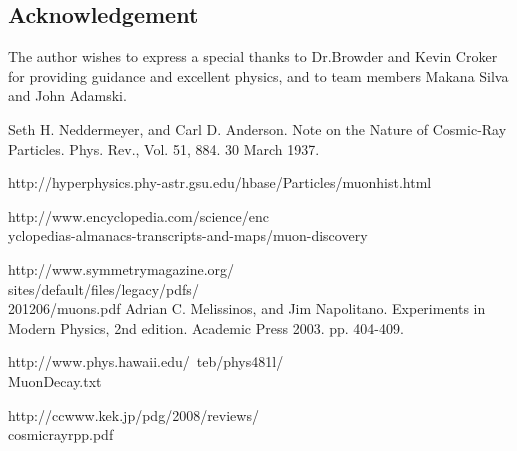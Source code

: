 \documentclass[11pt,twocolumn]{article}
\begin{document}
\subsection *{Acknowledgement}
\indent \indent
The author wishes to express a special thanks to Dr.Browder and Kevin Croker for providing guidance and excellent physics, and to team members Makana Silva and John Adamski.


\begin{thebibliography}{99}

Seth H. Neddermeyer, and Carl D. Anderson. Note on the Nature of Cosmic-Ray Particles. Phys. Rev., Vol. 51, 884. 30 March 1937.

http://hyperphysics.phy-astr.gsu.edu/hbase/Particles/muonhist.html

http://www.encyclopedia.com/science/enc\\yclopedias-almanacs-transcripts-and-maps/muon-discovery

http://www.symmetrymagazine.org/\\
sites/default/files/legacy/pdfs/\\201206/muons.pdf
Adrian C. Melissinos, and Jim Napolitano. Experiments in Modern Physics, 2nd edition. Academic Press 2003. pp. 404-409. 

http://www.phys.hawaii.edu/~teb/phys481l/\\MuonDecay.txt

http://ccwww.kek.jp/pdg/2008/reviews/\\cosmicrayrpp.pdf


\end{thebibliography}
\end{document}
